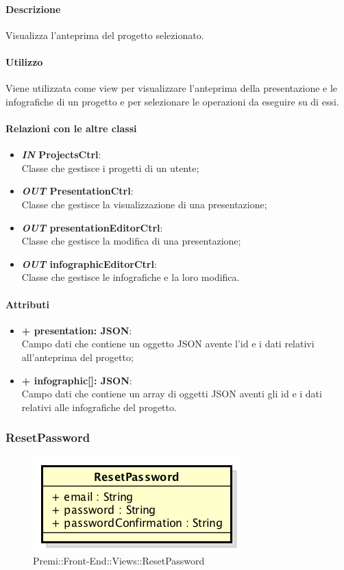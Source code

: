 	\paragraph{Descrizione}
	Visualizza l'anteprima del progetto selezionato.
	
	\paragraph{Utilizzo}
	Viene utilizzata come view per visualizzare l'anteprima della presentazione e le infografiche di un progetto e per selezionare le operazioni da eseguire su di essi.
	
	\paragraph{Relazioni con le altre classi}
	\begin{itemize}
		\item \textbf{\textit{IN} ProjectsCtrl}:\\
			Classe che gestisce i progetti di un utente;
		\item \textbf{\textit{OUT} PresentationCtrl}:\\
			Classe che gestisce la visualizzazione di una presentazione;
		\item \textbf{\textit{OUT} presentationEditorCtrl}:\\
			Classe che gestisce la modifica di una presentazione;
		\item \textbf{\textit{OUT} infographicEditorCtrl}:\\
			Classe che gestisce le infografiche e la loro modifica.
	\end{itemize}
	
	\paragraph{Attributi}
	\begin{itemize}
		\item \textbf{+ presentation: JSON}:\\
			Campo dati che contiene un oggetto JSON avente l'id e i dati relativi all'anteprima del progetto;
		\item \textbf{+ infographic[]: JSON}:\\
			Campo dati che contiene un array di oggetti JSON aventi gli id e i dati relativi alle infografiche del progetto.
	\end{itemize}
	
	
\subsubsection{ResetPassword}
	\begin{figure}[h]
		\centering
		\includegraphics[width=0.3\linewidth]{img/premi_front_end_views_resetpassword}
		\caption[Premi::Front-End::Views::ResetPassword]{Premi::Front-End::Views::ResetPassword}
	\end{figure}
	
